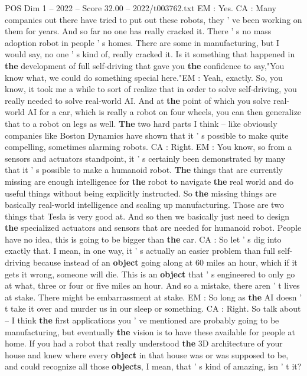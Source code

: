 \begin{textsample}{POS Dim 1 – 2022 – Score 32.00 – 2022/t003762.txt}
EM : Yes.
CA : Many companies out there have tried to put out these robots, they ' ve been working on them for years.
And so far no one has really cracked it.
There ' s no mass adoption robot in people ' s homes.
There are some in manufacturing, but I would say, no one ' s kind of, really cracked it.
Is it something that happened in \textbf{the} development of full self-driving that gave you \textbf{the} confidence to say,"You know what, we could do something special here."EM : Yeah, exactly.
So, you know, it took me a while to sort of realize that in order to solve self-driving, you really needed to solve real-world AI.
And at \textbf{the} point of which you solve real-world AI for a car, which is really a robot on four wheels, you can then generalize that to a robot on legs as well. \textbf{The} two hard parts I think -- like obviously companies like Boston Dynamics have shown that it ' s possible to make quite compelling, sometimes alarming robots.
CA : Right.
EM : You know, so from a sensors and actuators standpoint, it ' s certainly been demonstrated by many that it ' s possible to make a humanoid robot. \textbf{The} things that are currently missing are enough intelligence for \textbf{the} robot to navigate \textbf{the} real world and do useful things without being explicitly instructed.
So \textbf{the} missing things are basically real-world intelligence and scaling up manufacturing.
Those are two things that Tesla is very good at.
And so then we basically just need to design \textbf{the} specialized actuators and sensors that are needed for humanoid robot.
People have no idea, this is going to be bigger than \textbf{the} car.
CA : So let ' s dig into exactly that.
I mean, in one way, it ' s actually an easier problem than full self-driving because instead of an \textbf{object} going along at 60 miles an hour, which if it gets it wrong, someone will die.
This is an \textbf{object} that ' s engineered to only go at what, three or four or five miles an hour.
And so a mistake, there aren ' t lives at stake.
There might be embarrassment at stake.
EM : So long as \textbf{the} AI doesn ' t take it over and murder us in our sleep or something.
CA : Right.
So talk about -- I think \textbf{the} first applications you ' ve mentioned are probably going to be manufacturing, but eventually \textbf{the} vision is to have these available for people at home.
If you had a robot that really understood \textbf{the} 3D architecture of your house and knew where every \textbf{object} in that house was or was supposed to be, and could recognize all those \textbf{objects}, I mean, that ' s kind of amazing, isn ' t it?

\end{textsample}
